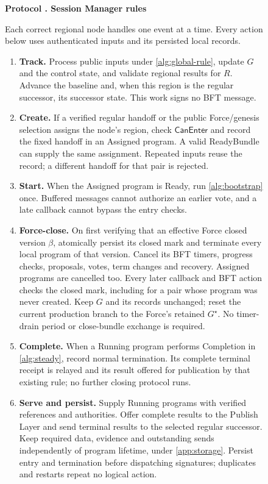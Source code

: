 \documentclass[11pt,a4paper]{article}
\newcommand{\tagg}[1]{\ensuremath{\mathsf{#1}}}
\newcounter{protocol}
\newenvironment{protocol}[3][htbp]{\begin{figure}[#1]\refstepcounter{protocol}\label{#2}
\begin{mdframed}[linewidth=.6pt,skipabove=0pt,skipbelow=0pt,
innertopmargin=7pt,innerbottommargin=7pt]\small
\textbf{Protocol \theprotocol. #3}\par\smallskip}{\end{mdframed}\end{figure}}
\begin{document}
\begin{protocol}[H]{alg:rotation}{Session Manager rules}
Each correct regional node handles one event at a time. Every action
below uses authenticated inputs and its persisted local records.
\begin{enumerate}[label=\textbf{\arabic*)},itemsep=3pt]
\item \textbf{Track.} Process public inputs under
\cref{alg:global-rule}, update $G$ and the control state, and validate
regional results for $R$. Advance the baseline and, when this region is
the regular successor, its successor state. This work signs no BFT
message.
\item \textbf{Create.} If a verified regular handoff or the public
Force/genesis selection assigns the node's region, check
\tagg{CanEnter} and record the fixed handoff in an Assigned program.
A valid ReadyBundle can supply the same assignment. Repeated inputs
reuse the record; a different handoff for that pair is rejected.
\item \textbf{Start.} When the Assigned program is Ready, run
\cref{alg:bootstrap} once. Buffered messages cannot authorize an earlier
vote, and a late callback cannot bypass the entry checks.
\item \textbf{Force-close.} On first verifying that an effective Force closed
version $\beta$, atomically persist its closed mark and terminate every
local program of that version. Cancel its BFT timers, progress checks,
proposals, votes, term changes and recovery. Assigned programs are
cancelled too. Every later callback and BFT action checks the closed
mark, including for a pair whose program was never created. Keep $G$
and its records unchanged; reset the current production branch to the
Force's retained $G^\star$. No timer-drain period or close-bundle
exchange is required.
\item \textbf{Complete.} When a Running program performs Completion in
\cref{alg:steady}, record normal termination. Its complete terminal
receipt is relayed and its result offered for publication by that
existing rule; no further closing protocol runs.
\item \textbf{Serve and persist.} Supply Running programs with verified
references and authorities. Offer complete results to the Publish Layer
and send terminal results to the selected regular successor. Keep
required data, evidence and outstanding sends independently of program
lifetime, under \cref{app:storage}. Persist entry and termination before
dispatching signatures; duplicates and restarts repeat no logical action.
\end{enumerate}
\end{protocol}
\end{document}

